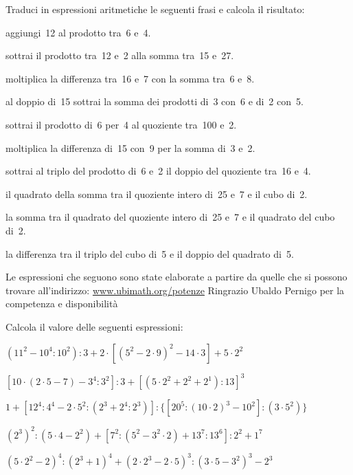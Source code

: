 \begin{esercizio}
Traduci in espressioni aritmetiche le seguenti frasi e calcola il risultato:
\begin{enumeratees}
\item aggiungi~12 al prodotto tra~6 e~4.
\item sottrai il prodotto tra~12 e~2 alla somma tra~15 e~27.
\item moltiplica la differenza tra~16 e~7 con la somma tra~6 e~8.
\item al doppio di~15 sottrai la somma dei prodotti di~3 con~6 e di~2 con~5.
\item sottrai il prodotto di~6 per~4 al quoziente tra~100 e~2.
\item moltiplica la differenza di~15 con~9 per la somma di~3 e~2.
\item sottrai al triplo del prodotto di~6 e~2 il doppio del quoziente
tra~16 e~4. 
\item il quadrato della somma tra il quoziente intero di~25 e~7 e il cubo 
di~2. 
\item la somma tra il quadrato del quoziente intero di~25 e~7 e il quadrato 
del cubo di~2.
\item la differenza tra il triplo del cubo di~5 e il doppio del quadrato 
di~5.
\end{enumeratees}
\end{esercizio}

Le espressioni che seguono sono state elaborate a partire da quelle che si 
possono trovare all'indirizzo:
\href{http://www.ubimath.org/potenze}{www.ubimath.org/potenze}
Ringrazio Ubaldo Pernigo per la competenza e disponibilità

Calcola il valore delle seguenti espressioni:

\begin{esercizio} %
\((11^2-10^4:10^2):3+2\cdot[(5^2-2\cdot9)^2-14\cdot3]+5\cdot2^2\) 
\end{esercizio}
\begin{esercizio} %
\([10\cdot(2\cdot5-7)-3^4:3^2]:3+[(5\cdot2^2+2^2+2^1):13]^3\) 
\end{esercizio}
\begin{esercizio} %
\(1+[12^4:4^4-2\cdot5^2:(2^3+2^4:2^3)]:
  \{[20^5:(10\cdot2)^3-10^2]:(3\cdot5^2)\}\) 
\end{esercizio}
\begin{esercizio} %
\((2^3)^2:(5\cdot4-2^2)+[7^2:(5^2-3^2\cdot2)+13^7:13^6]:2^2+1^7\) 
\end{esercizio}
\begin{esercizio} %
\((5\cdot2^2-2)^4:(2^3+1)^4+(2\cdot2^3-2\cdot5)^3:(3\cdot5-3^2)^3-2^3\)
\end{esercizio}

